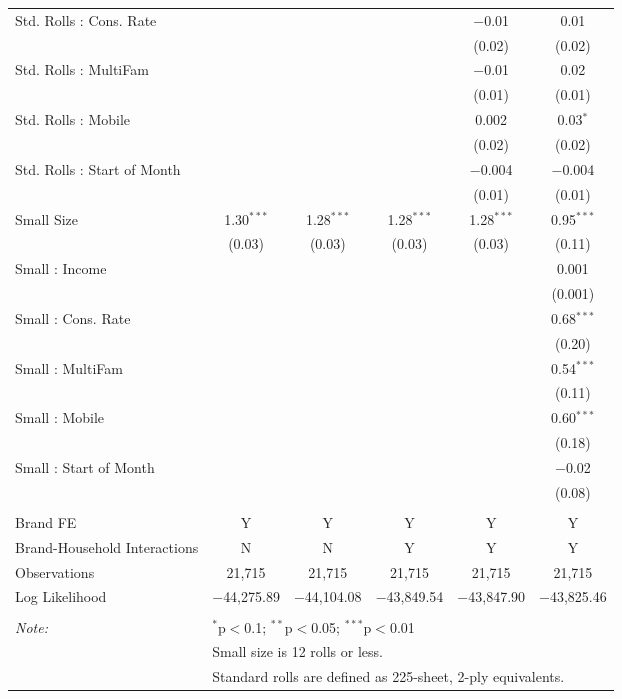 \begin{table}[!htbp]
\begin{tabular}{@{\extracolsep{5pt}}lccccc}
  Std. Rolls : Cons. Rate &  &  &  & $-$0.01 & 0.01 \\ 
  &  &  &  & (0.02) & (0.02) \\ 
  Std. Rolls : MultiFam &  &  &  & $-$0.01 & 0.02 \\ 
  &  &  &  & (0.01) & (0.01) \\ 
  Std. Rolls : Mobile &  &  &  & 0.002 & 0.03$^{*}$ \\ 
  &  &  &  & (0.02) & (0.02) \\ 
  Std. Rolls : Start of Month &  &  &  & $-$0.004 & $-$0.004 \\ 
  &  &  &  & (0.01) & (0.01) \\ 
  Small Size & 1.30$^{***}$ & 1.28$^{***}$ & 1.28$^{***}$ & 1.28$^{***}$ & 0.95$^{***}$ \\ 
  & (0.03) & (0.03) & (0.03) & (0.03) & (0.11) \\ 
  Small : Income &  &  &  &  & 0.001 \\ 
  &  &  &  &  & (0.001) \\ 
  Small : Cons. Rate &  &  &  &  & 0.68$^{***}$ \\ 
  &  &  &  &  & (0.20) \\ 
  Small : MultiFam &  &  &  &  & 0.54$^{***}$ \\ 
  &  &  &  &  & (0.11) \\ 
  Small : Mobile &  &  &  &  & 0.60$^{***}$ \\ 
  &  &  &  &  & (0.18) \\ 
  Small : Start of Month &  &  &  &  & $-$0.02 \\ 
  &  &  &  &  & (0.08) \\ 
 \hline \\[-1.8ex] 
Brand FE & Y & Y & Y & Y & Y \\ 
Brand-Household Interactions & N & N & Y & Y & Y \\ 
Observations & 21,715 & 21,715 & 21,715 & 21,715 & 21,715 \\ 
Log Likelihood & $-$44,275.89 & $-$44,104.08 & $-$43,849.54 & $-$43,847.90 & $-$43,825.46 \\ 
\hline 
\hline \\[-1.8ex] 
\textit{Note:}  & \multicolumn{5}{l}{$^{*}$p$<$0.1; $^{**}$p$<$0.05; $^{***}$p$<$0.01} \\ 
 & \multicolumn{5}{l}{Small size is 12 rolls or less.} \\ 
 & \multicolumn{5}{l}{Standard rolls are defined as 225-sheet, 2-ply equivalents.} \\ 
\end{tabular} 
\end{table} 
